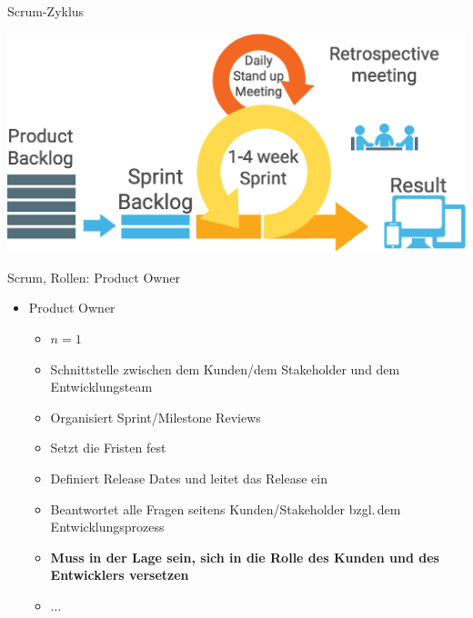\documentclass{beamer}
\begin{document}
\begin{frame}{Scrum-Zyklus}
	\begin{center}
		\includegraphics[scale=.25]{scrum-process.eps}
	\end{center}
\end{frame}

\begin{frame}{Scrum, Rollen: Product Owner}
	\begin{itemize}
		\item Product Owner
			\begin{itemize}
				\item $n = 1$
				\item Schnittstelle zwischen dem Kunden/dem Stakeholder und dem Entwicklungsteam
				\item Organisiert Sprint/Milestone Reviews
				\item Setzt die Fristen fest
				\item Definiert Release Dates und leitet das Release ein
				\item Beantwortet alle Fragen seitens Kunden/Stakeholder bzgl.\,dem Entwicklungsprozess
				\item \textbf{Muss in der Lage sein, sich in die Rolle des Kunden und des Entwicklers versetzen}
				\item $\ldots$
			\end{itemize}
	\end{itemize}
\end{frame}
\end{document}
